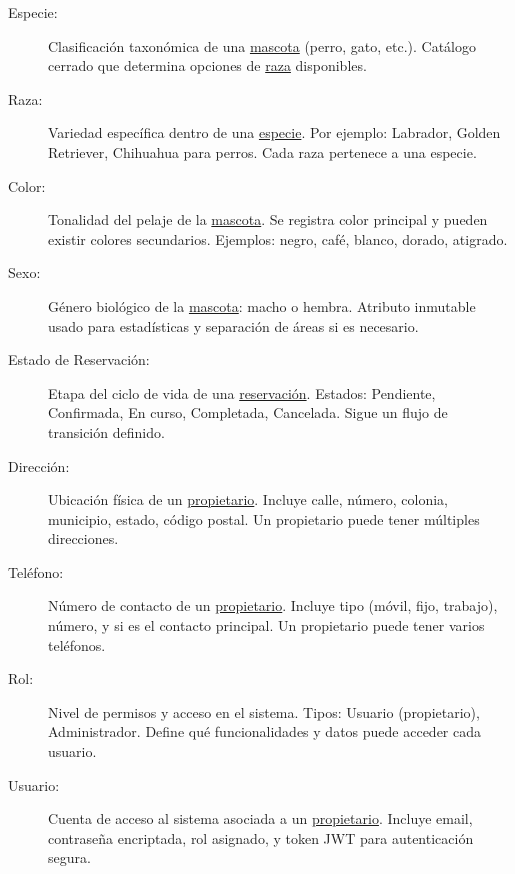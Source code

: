 \begin{description}
	
	\item[\hypertarget{tEspecie}{Especie:}] Clasificación taxonómica de una \hyperlink{tMascota}{mascota} (perro, gato, etc.). Catálogo cerrado que determina opciones de \hyperlink{tRaza}{raza} disponibles.
	
	\item[\hypertarget{tRaza}{Raza:}] Variedad específica dentro de una \hyperlink{tEspecie}{especie}. Por ejemplo: Labrador, Golden Retriever, Chihuahua para perros. Cada raza pertenece a una especie.
	
	\item[\hypertarget{tColor}{Color:}] Tonalidad del pelaje de la \hyperlink{tMascota}{mascota}. Se registra color principal y pueden existir colores secundarios. Ejemplos: negro, café, blanco, dorado, atigrado.
	
	\item[\hypertarget{tSexo}{Sexo:}] Género biológico de la \hyperlink{tMascota}{mascota}: macho o hembra. Atributo inmutable usado para estadísticas y separación de áreas si es necesario.
	
	\item[\hypertarget{tEstadoReservacion}{Estado de Reservación:}] Etapa del ciclo de vida de una \hyperlink{tReservacion}{reservación}. Estados: Pendiente, Confirmada, En curso, Completada, Cancelada. Sigue un flujo de transición definido.
	
	
	\item[\hypertarget{tDireccion}{Dirección:}] Ubicación física de un \hyperlink{tPropietario}{propietario}. Incluye calle, número, colonia, municipio, estado, código postal. Un propietario puede tener múltiples direcciones.
	
	\item[\hypertarget{tTelefono}{Teléfono:}] Número de contacto de un \hyperlink{tPropietario}{propietario}. Incluye tipo (móvil, fijo, trabajo), número, y si es el contacto principal. Un propietario puede tener varios teléfonos.
	
	
	\item[\hypertarget{tRol}{Rol:}] Nivel de permisos y acceso en el sistema. Tipos: Usuario (propietario), Administrador. Define qué funcionalidades y datos puede acceder cada usuario.
	
	\item[\hypertarget{tUsuario}{Usuario:}] Cuenta de acceso al sistema asociada a un \hyperlink{tPropietario}{propietario}. Incluye email, contraseña encriptada, rol asignado, y token JWT para autenticación segura.

\end{description}

